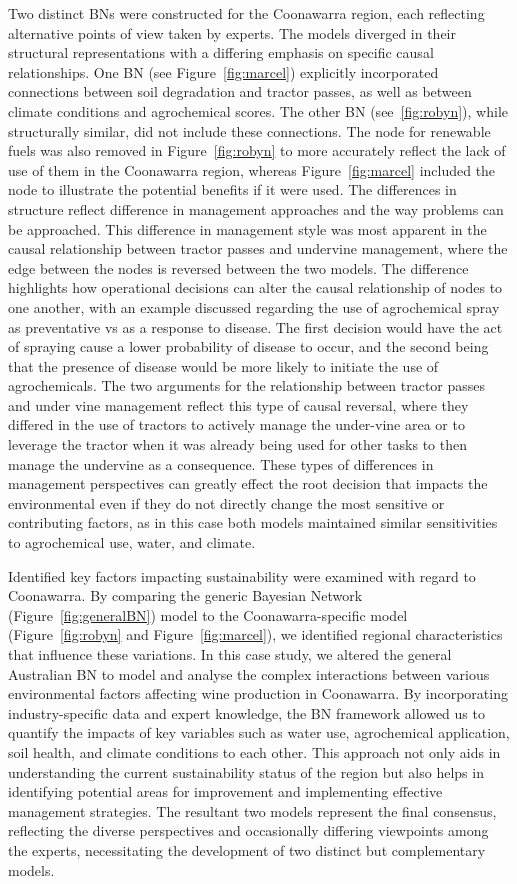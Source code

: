 \documentclass[fleqn,10pt]{wlscirep}
\begin{document}
Two distinct BNs were constructed for the Coonawarra region, each reflecting alternative points of view taken by experts. The models diverged in their structural representations with a differing emphasis on specific causal relationships. One BN (see Figure~\ref{fig:marcel}) explicitly incorporated connections between soil degradation and tractor passes, as well as between climate conditions and agrochemical scores. The other BN (see~\ref{fig:robyn}), while structurally similar, did not include these connections. The node for renewable fuels was also removed in Figure~\ref{fig:robyn} to more accurately reflect the lack of use of them in the Coonawarra region, whereas Figure~\ref{fig:marcel} included the node to illustrate the potential benefits if it were used. The differences in structure reflect difference in management approaches and the way problems can be approached. This difference in management style was most apparent in the causal relationship between tractor passes and undervine management, where the edge between the nodes is reversed between the two models. The difference highlights how operational decisions can alter the causal relationship of nodes to one another, with an example discussed regarding the use of agrochemical spray as preventative vs as a response to disease. The first decision would have the act of spraying cause a lower probability of disease to occur, and the second being that the presence of disease would be more likely to initiate the use of agrochemicals. The two arguments for the relationship between tractor passes and under vine management reflect this type of causal reversal, where they differed in the use of tractors to actively manage the under-vine area or to leverage the tractor when it was already being used for other tasks to then manage the undervine as a consequence. These types of differences in management perspectives can greatly effect the root decision that impacts the environmental even if they do not directly change the most sensitive or contributing factors, as in this case both models maintained similar sensitivities to agrochemical use, water, and climate.

Identified key factors impacting sustainability were examined with regard to Coonawarra. By comparing the generic Bayesian Network (Figure~\ref{fig:generalBN}) model to the Coonawarra-specific model (Figure~\ref{fig:robyn} and Figure~\ref{fig:marcel}), we identified regional characteristics that influence these variations. In this case study, we altered the general Australian BN to model and analyse the complex interactions between various environmental factors affecting wine production in Coonawarra. By incorporating industry-specific data and expert knowledge, the BN framework allowed us to quantify the impacts of key variables such as water use, agrochemical application, soil health, and climate conditions to each other. This approach not only aids in understanding the current sustainability status of the region but also helps in identifying potential areas for improvement and implementing effective management strategies. The resultant two models represent the final consensus, reflecting the diverse perspectives and occasionally differing viewpoints among the experts, necessitating the development of two distinct but complementary models.
\end{document}
